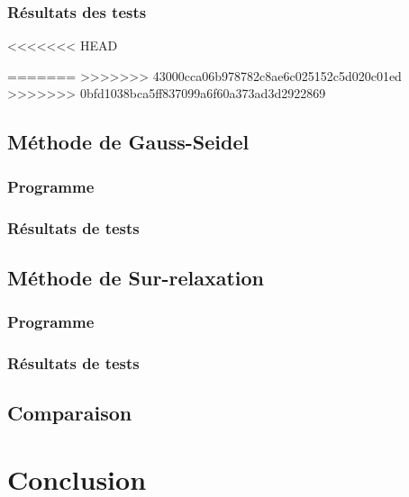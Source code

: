 \documentclass{report}
\begin{document}
      \subsection{Résultats des tests}
<<<<<<< HEAD
        
=======
>>>>>>> 43000cca06b978782c8ae6c025152c5d020c01ed
>>>>>>> 0bfd1038bca5ff837099a6f60a373ad3d2922869
  	\newpage
  	\section{Méthode de Gauss-Seidel}
  	  \subsection{Programme}
        
      \newpage
      \subsection{Résultats de tests}
  	\newpage
  	\section{Méthode de Sur-relaxation}
  	  \subsection{Programme}
        
      \newpage
      \subsection{Résultats de tests}
     \newpage
     \section{Comparaison}
  \chapter*{Conclusion}
  
\end{document}
